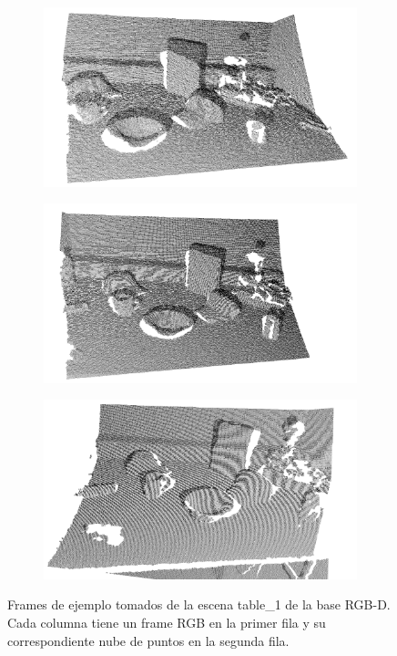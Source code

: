 \begin{figure}
    \begin{subfigure}[b]{0.3\textwidth}
        \includegraphics[width=\textwidth]{img/escena_rgbd/table_1_27_pcd.png}
    \end{subfigure}
    \quad
    \begin{subfigure}[b]{0.3\textwidth}
        \includegraphics[width=\textwidth]{img/escena_rgbd/table_1_34_pcd.png}
    \end{subfigure}
    \quad
    \begin{subfigure}[b]{0.3\textwidth}
        \includegraphics[width=\textwidth]{img/escena_rgbd/table_1_48_pcd.png}
    \end{subfigure}

    \caption{Frames de ejemplo tomados de la escena table\_1 de la base RGB-D. Cada columna tiene un frame RGB en la primer fila y su correspondiente nube de puntos en la segunda fila.}
    \label{fig:escena_rgbd_base}
\end{figure}

